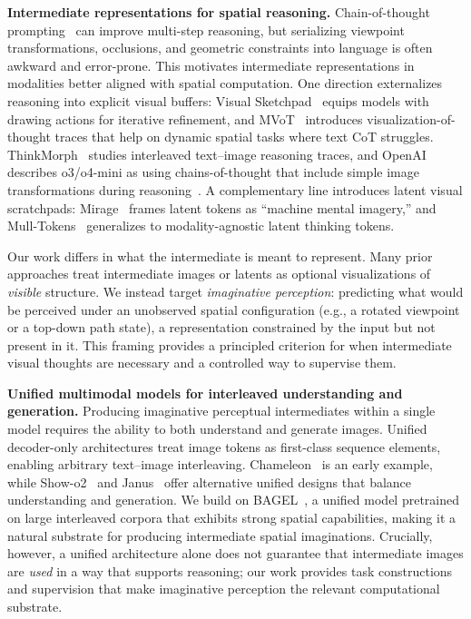 \noindent\textbf{Intermediate representations for spatial reasoning.}
Chain-of-thought prompting~\cite{wei2022cot} can improve multi-step reasoning, but serializing viewpoint transformations, occlusions, and geometric constraints into language is often awkward and error-prone. This motivates intermediate representations in modalities better aligned with spatial computation. One direction externalizes reasoning into explicit visual buffers: Visual Sketchpad~\cite{hu2024visualsketchpad} equips models with drawing actions for iterative refinement, and MVoT~\cite{li2025mvot} introduces visualization-of-thought traces that help on dynamic spatial tasks where text CoT struggles. ThinkMorph~\cite{gu2025thinkmorph} studies interleaved text--image reasoning traces, and OpenAI describes o3/o4-mini as using chains-of-thought that include simple image transformations during reasoning~\cite{openai2025thinkingimages}. A complementary line introduces latent visual scratchpads: Mirage~\cite{yang2025mirage} frames latent tokens as ``machine mental imagery,'' and Mull-Tokens~\cite{ray2025mulltokens} generalizes to modality-agnostic latent thinking tokens.

Our work differs in what the intermediate is meant to represent. Many prior approaches treat intermediate images or latents as optional visualizations of \emph{visible} structure. We instead target \emph{imaginative perception}: predicting what would be perceived under an unobserved spatial configuration (e.g., a rotated viewpoint or a top-down path state), a representation constrained by the input but not present in it. This framing provides a principled criterion for when intermediate visual thoughts are necessary and a controlled way to supervise them.


\noindent\textbf{Unified multimodal models for interleaved understanding and generation.}
Producing imaginative perceptual intermediates within a single model requires the ability to both understand and generate images. Unified decoder-only architectures treat image tokens as first-class sequence elements, enabling arbitrary text--image interleaving. Chameleon~\cite{chameleon2024chameleon} is an early example, while Show-o2~\cite{xie2025showo2} and Janus~\cite{chen2025januspro} offer alternative unified designs that balance understanding and generation. We build on BAGEL~\cite{deng2025bagel}, a unified model pretrained on large interleaved corpora that exhibits strong spatial capabilities, making it a natural substrate for producing intermediate spatial imaginations. Crucially, however, a unified architecture alone does not guarantee that intermediate images are \emph{used} in a way that supports reasoning; our work provides task constructions and supervision that make imaginative perception the relevant computational substrate.